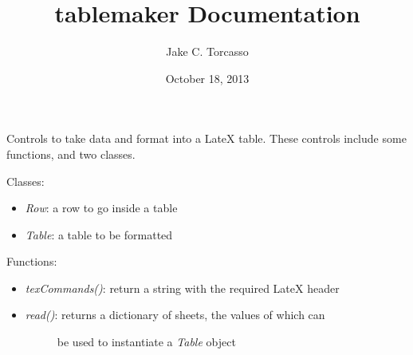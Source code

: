 \documentclass[letterpaper,10pt,english]{sphinxmanual}
\title{tablemaker Documentation}
\date{October 18, 2013}
\author{Jake C. Torcasso}
\begin{document}
\maketitle
\tableofcontents
{}\label{index::doc}\label{summary:module-tablemaker}


Controls to take data and format into a LateX table. These controls 
include some functions, and two classes.

Classes:
\begin{itemize}
\item {} 
\emph{Row}: a row to go inside a table

\item {} 
\emph{Table}: a table to be formatted

\end{itemize}

Functions:
\begin{itemize}
\item {} 
\emph{texCommands()}: return a string with the required LateX header

\item {} \begin{description}
\item[{\emph{read()}: \textbar{} returns a dictionary of sheets, the values of which can}] \leavevmode
be used to instantiate a \emph{Table} object

\end{description}

\end{itemize}
\end{document}
